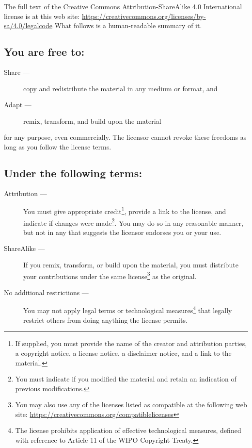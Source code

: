 \documentclass[letterpaper,twoside]{article}
\begin{document}
The full text of the Creative Commons Attribution-ShareAlike 4.0
International license is at this web site:
\href{https://creativecommons.org/licenses/by-sa/4.0/legalcode}{https://creativecommons.org/licenses/by-sa/4.0/legalcode}%
What follows is a human-readable summary of it.

\subsection{You are free to:}
\begin{description}
\item[Share ---]copy and redistribute the material in any medium or format, and
\item[Adapt ---]remix, transform, and build upon the material
\end{description}
for any purpose, even commercially.  The licensor cannot revoke these
freedoms as long as you follow the license terms.
\subsection{Under the following terms:}
\begin{description}
\item[Attribution ---]You must give appropriate credit\footnote{If supplied,
  you must provide the name of the creator and attribution parties,
  a copyright notice, a license notice, a disclaimer notice, and a link
  to the material.}, provide a link to
  the license, and indicate if changes were made\footnote{You must indicate if
    you modified the material and retain an indication of previous
    modifications.}.  You may do so in any
  reasonable manner, but not in any that suggests the licensor endorses you
  or your use.
\item[ShareAlike ---]If you remix, transform, or build upon the material,
  you must distribute your contributions under the same
  license\footnote{You may also use any of the licenses listed as compatible
    at the following web site:
    \href{https://creativecommons.org/compatiblelicenses}{https://creativecommons.org/compatiblelicenses}}
  as the original.
\item[No additional restrictions ---]You may not apply legal terms or
  technological measures\footnote{The license prohibits application of
    effective technological measures, defined with reference to Article 11
    of the WIPO Copyright Treaty.}
  that legally restrict others from doing anything
  the license permits.
\end{description}
\end{document}
